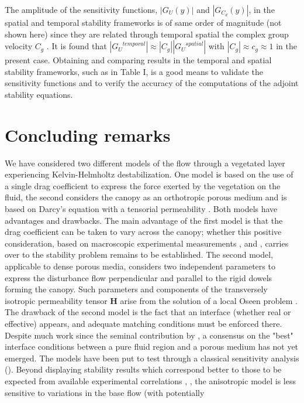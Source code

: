 The amplitude of the sensitivity functions, $|G_{U} ( y)|$ and $|G_{C_d} (y)|$, in the spatial and temporal
stability frameworks is of same order of magnitude (not shown here) since they are related through
temporal spatial the complex group velocity $C_g$ . It is found that $|{G_U}^{temporal}| \approx |C_g ||{G_U}^{spatial}|$ with $|C_g | \approx c_g \approx 1$ in the
present case.
Obtaining and comparing results in the temporal and spatial stability frameworks, such as in
Table I, is a good means to validate the sensitivity functions and to verify the accuracy of the
computations of the adjoint stability equations.


\section{Concluding remarks}
We have considered two different models of the flow through a vegetated layer experiencing Kelvin-Helmholtz destabilization. One model is based on the use of a single drag coefficient to express the force exerted by the vegetation on the fluid, the second considers the canopy as an orthotropic porous medium and is based on Darcy’s equation with a tensorial permeability \citet{zampogna2016fluid}. 
Both models have advantages and drawbacks. The main advantage of the first model is that the
drag coefficient can be taken to vary across the canopy; whether this positive consideration, based
on macroscopic experimental measurements \citet{ghisalberti2002mixing}, \citet{ghisalberti2004limited} and \citet{ghisalberti2005mass},  carries over to the stability problem remains to be established. The second model, applicable to dense porous media, considers two independent parameters to express the disturbance flow perpendicular and parallel to the rigid dowels forming
the canopy. Such parameters and components of the transversely isotropic permeability tensor $\mathbf{H}$
arise from the solution of a local Oseen problem \citet{zampogna2016fluid}. The drawback of the second model is the
fact that an interface (whether real or effective) appears, and adequate matching conditions must
be enforced there. Despite much work since the seminal contribution by \citet{beaver}, a
consensus on the "best" interface conditions between a pure fluid region and a porous medium has
not yet emerged.
The models have been put to test through a classical sensitivity analysis (\citet{bottaro2003effect}). Beyond displaying stability results which correspond better to those to be expected from available experimental correlations \citet{raupach1996coherent}, \citet{zampogna2016instability}, the anisotropic model is less sensitive to variations in the base flow (with potentially
